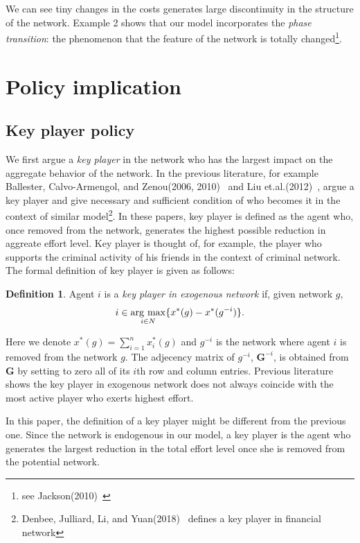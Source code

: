 \documentclass[12pt]{article}
\theoremstyle{definition}
\newtheorem{definition}{Definition}
\newcommand{\bm}[1]{\boldsymbol{#1}}
\newcommand{\argmax}{\mathop{\rm arg~max}\limits}
\begin{document}
We can see tiny changes in the costs generates large discontinuity in the structure of the network.
Example 2 shows that our model incorporates the {\it{phase transition}}: the phenomenon that the feature of the network is totally changed\footnote{see Jackson(2010)~\cite{social}}.


\section{Policy implication}

\subsection{Key player policy}

We first argue a {\it{key player}} in the network who has the largest impact on the aggregate behavior of the network.
In the previous literature, for example Ballester, Calvo-Armengol, and Zenou(2006, 2010)~\cite{whowho, delinquent} and Liu et.al.(2012)~\cite{criminal}, argue a key player and give necessary and sufficient condition of who becomes it in the context of similar model\footnote{Denbee, Julliard, Li, and Yuan(2018)~\cite{denbee} defines a key player in financial network}.
In these papers, key player is defined as the agent who, once removed from the network, generates the highest possible reduction in aggreate effort level.
Key player is thought of, for example, the player who supports the criminal activity of his friends in the context of criminal network.
The formal definition of key player is given as follows:

\begin{definition}
Agent $i$ is a {\it{key player in exogenous network}} if, given network $g$,
\[ i \in \argmax_{i \in N} \{ x^*(g) - x^*(g^{-i}) \}. \]
\end{definition}

Here we denote $x^*(g) = \sum_{i=1}^n x_i^*(g)$ and $g^{-i}$ is the network where agent $i$ is removed from the network $g$.
The adjecency matrix of $g^{-i}$, $\bm{G}^{-i}$, is obtained from $\bm{G}$ by setting to zero all of its $i$th row and column entries.
Previous literature shows the key player in exogenous network does not always coincide with the most active player who exerts highest effort.

In this paper, the definition of a key player might be different from the previous one.
Since the network is endogenous in our model, a key player is the agent who generates the largest reduction in the total effort level once she is removed from the potential network.
\end{document}
